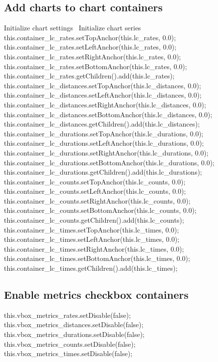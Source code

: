 \subsection{Add charts to chart containers}
\nwenddocs{}\endmoddef{}
\LA{}Initialize chart settings~{\nwtagstyle{}}\RA{}
\LA{}Initialize chart series~{\nwtagstyle{}}\RA{}
this.container_lc_rates.setTopAnchor(this.lc_rates, 0.0);
this.container_lc_rates.setLeftAnchor(this.lc_rates, 0.0);
this.container_lc_rates.setRightAnchor(this.lc_rates, 0.0);
this.container_lc_rates.setBottomAnchor(this.lc_rates, 0.0);
this.container_lc_rates.getChildren().add(this.lc_rates);
this.container_lc_distances.setTopAnchor(this.lc_distances, 0.0);
this.container_lc_distances.setLeftAnchor(this.lc_distances, 0.0);
this.container_lc_distances.setRightAnchor(this.lc_distances, 0.0);
this.container_lc_distances.setBottomAnchor(this.lc_distances, 0.0);
this.container_lc_distances.getChildren().add(this.lc_distances);
this.container_lc_durations.setTopAnchor(this.lc_durations, 0.0);
this.container_lc_durations.setLeftAnchor(this.lc_durations, 0.0);
this.container_lc_durations.setRightAnchor(this.lc_durations, 0.0);
this.container_lc_durations.setBottomAnchor(this.lc_durations, 0.0);
this.container_lc_durations.getChildren().add(this.lc_durations);
this.container_lc_counts.setTopAnchor(this.lc_counts, 0.0);
this.container_lc_counts.setLeftAnchor(this.lc_counts, 0.0);
this.container_lc_counts.setRightAnchor(this.lc_counts, 0.0);
this.container_lc_counts.setBottomAnchor(this.lc_counts, 0.0);
this.container_lc_counts.getChildren().add(this.lc_counts);
this.container_lc_times.setTopAnchor(this.lc_times, 0.0);
this.container_lc_times.setLeftAnchor(this.lc_times, 0.0);
this.container_lc_times.setRightAnchor(this.lc_times, 0.0);
this.container_lc_times.setBottomAnchor(this.lc_times, 0.0);
this.container_lc_times.getChildren().add(this.lc_times);
\nwendcode{}\nwdocspar

\subsection{Enable metrics checkbox containers}
\nwenddocs{}\endmoddef{}
this.vbox_metrics_rates.setDisable(false);
this.vbox_metrics_distances.setDisable(false);
this.vbox_metrics_durations.setDisable(false);
this.vbox_metrics_counts.setDisable(false);
this.vbox_metrics_times.setDisable(false);
\nwendcode{}\nwdocspar

